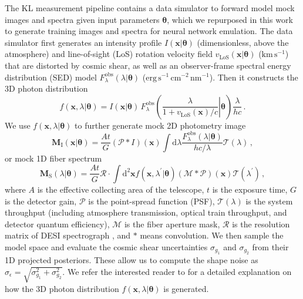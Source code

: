 The KL measurement pipeline contains a data simulator to forward model mock images and spectra given input parameters $\bm{\theta}$, which we repurposed in this work to generate training images and spectra for neural network emulation. The data simulator first generates an intensity profile $I(\bm{x}|\bm{\theta})$ (dimensionless, above the atmosphere) and line-of-sight (LoS) rotation velocity field $v_\mathrm{LoS}(\bm{x}|\bm{\theta})$ ($\mathrm{km}\,\mathrm{s}^{-1}$) that are distorted by cosmic shear, as well as an observer-frame spectral energy distribution (SED) model $F_\lambda^\mathrm{obs}(\lambda|\bm{\theta})$ ($\mathrm{erg}\,\mathrm{s}^{-1}\,\mathrm{cm}^{-2}\,\mathrm{nm}^{-1}$). Then it constructs the 3D photon distribution
\begin{equation}
    f(\bm{x},\lambda|\bm{\theta})=I(\bm{x}|\bm{\theta})\, F_\lambda^\mathrm{obs}\left(\left.\frac{\lambda}{1+v_\mathrm{LoS}(\bm{x})/c}\right|\bm{\theta}\right)\frac{\lambda}{hc}\,.
\end{equation}
We use $f(\bm{x},\lambda|\bm{\theta})$ to further generate mock 2D photometry image
\begin{equation}
\label{eqn:mock_img}
    \bm{M}_\mathrm{I}(\bm{x}|\bm{\theta})=\frac{At}{G}(\mathcal{P}\ast I)(\bm{x})\int\mathrm{d}\lambda \frac{F_\lambda^\mathrm{obs}(\lambda|\bm{\theta})}{hc/\lambda} \mathcal{T}(\lambda)\,,
\end{equation}
or mock 1D fiber spectrum
\begin{equation}
\label{eqn:mock_spec}
    \bm{M}_\mathrm{S}(\lambda|\bm{\theta}) = \frac{At}{G}\mathcal{R}\cdot\int\mathrm{d}^2\bm{x}f(\bm{x},\lambda^\prime|\bm{\theta})(\mathcal{M}\ast\mathcal{P})(\bm{x})\mathcal{T}(\lambda^\prime)\,,
\end{equation}
where $A$ is the effective collecting area of the telescope, $t$ is the exposure time, $G$ is the detector gain, $\mathcal{P}$ is the point-spread function (PSF), $\mathcal{T}(\lambda)$ is the system throughput (including atmosphere transmission, optical train throughput, and detector quantum efficiency), $\mathcal{M}$ is the fiber aperture mask, $\mathcal{R}$ is the resolution matrix of DESI spectrograph \citep{BS10,GBK+23}, and $\ast$ means convolution. We then sample the model space and evaluate the cosmic shear uncertainties $\sigma_{g_1}$ and $\sigma_{g_2}$ from their 1D projected posteriors. These allow us to compute the shape noise as $\sigma_\epsilon=\sqrt{\sigma_{g_1}^2+\sigma_{g_2}^2}$. We refer the interested reader to \citep{xu2024KL} for a detailed explanation on how the 3D photon distribution $f(\bm{x},\lambda|\bm{\theta})$ is generated.
